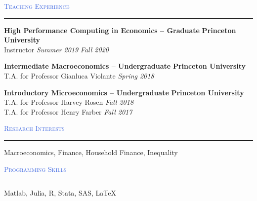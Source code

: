 \documentclass{resume} %
\renewenvironment{rSection}[1]{
\sectionskip
\textcolor{RoyalBlue}{\textsc{#1}}
\sectionlineskip
\hrule
\begin{list}{}{
\setlength{\leftmargin}{1.5em}
}
\item[]
}{
\end{list}
}
\begin{document}

\begin{rSection}{Teaching Experience}

{\bf High Performance Computing in Economics -- Graduate} \hfill {\bf Princeton University} \\
{Instructor} \hfill {\em Summer 2019}
{} \hfill {\em Fall 2020}

{\bf Intermediate Macroeconomics -- Undergraduate} \hfill {\bf Princeton University} \\
{T.A. for Professor Gianluca Violante} \hfill {\em Spring 2018} 

{\bf Introductory Microeconomics -- Undergraduate} \hfill {\bf Princeton University} \\
{T.A. for Professor Harvey Rosen} \hfill {\em Fall 2018} \\
{T.A. for Professor Henry Farber} \hfill {\em Fall 2017} 

\end{rSection}


\begin{rSection}{Research Interests}

Macroeconomics, Finance, Household Finance, Inequality

\end{rSection}



\begin{rSection}{Programming Skills}

Matlab, Julia, R, Stata, SAS, \LaTeX

\end{rSection}
\end{document}
